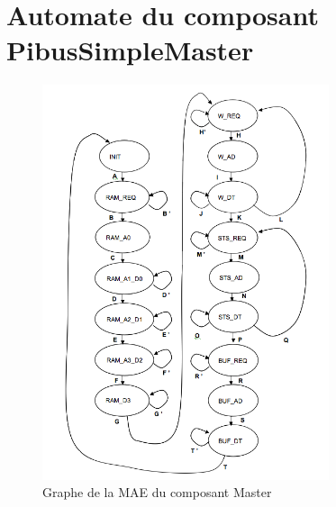 \documentclass{article}
\begin{document}
\section{Automate du composant PibusSimpleMaster}

\begin{figure}[H]
\includegraphics[width=0.75\textwidth]{pics/mae_master.png}
\centering
\caption{Graphe de la MAE du composant Master}
\label{mae_ram}
\end{figure}
\end{document}
